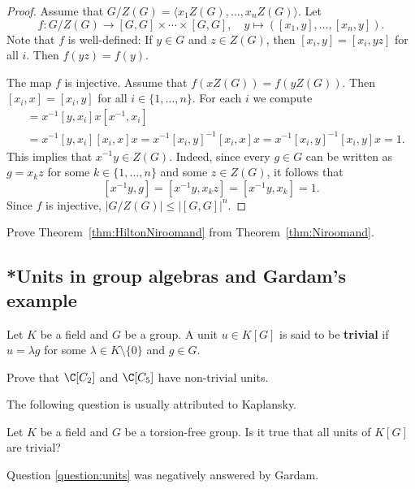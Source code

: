 \begin{proof}
	Assume that $G/Z(G)=\langle x_1Z(G),\dots,x_nZ(G)\rangle$. Let 
	\[
		f\colon G/Z(G)\to [G,G]\times\cdots\times [G,G],
		\quad
		y\mapsto ([x_1,y],\dots,[x_n,y]).
	\]
	Note that $f$ is well-defined: If $y\in G$ and $z\in Z(G)$, then $[x_i,y]=[x_i,yz]$ for all $i$. 
	Then $f(yz)=f(y)$.
	 
	The map $f$ is injective. Assume that $f(xZ(G))=f(yZ(G))$. Then 
	$[x_i,x]=[x_i,y]$ for all $i\in\{1,\dots,n\}$. For each $i$ we compute  
	\begin{align*}
		[x^{-1}y,x_i] &= x^{-1}[y,x_i]x[x^{-1},x_i]\\
		&=x^{-1}[y,x_i][x_i,x]x=x^{-1}[x_i,y]^{-1}[x_i,x]x=x^{-1}[x_i,y]^{-1}[x_i,y]x=1.
	\end{align*}
	This implies that $x^{-1}y\in Z(G)$. Indeed, since  
	every $g\in G$ can be written as $g=x_kz$ for some $k\in\{1,\dots,n\}$ and some $z\in Z(G)$, 
	it follows that 
    \[
    [x^{-1}y,g]=[x^{-1}y,x_kz]=[x^{-1}y,x_k]=1.
    \]
    Since $f$ is injective, 
	$|G/Z(G)|\leq |[G,G]|^n$. 
\end{proof}

\begin{exercise}
    Prove Theorem~\ref{thm:HiltonNiroomand} from Theorem~\ref{thm:Niroomand}. 
\end{exercise}


\subsection{*Units in group algebras and Gardam's example}

Let $K$ be a field and $G$ be a group. A unit $u\in K[G]$ is said
to be \textbf{trivial} if $u=\lambda g$ for some $\lambda\in K\setminus\{0\}$ and
$g\in G$.	

\begin{exercise}
\label{xca:non_trivial:C2andC5}
	Prove that $\C[C_2]$ and $\C[C_5]$ have non-trivial units.
\end{exercise}

The following question is usually attributed to Kaplansky. 

\begin{question}
	\label{question:units}
	Let $K$ be a field and $G$ be a torsion-free group. Is it true that all units of $K[G]$ are
	trivial?
\end{question}

Question \ref{question:units} was negatively answered by Gardam. 


